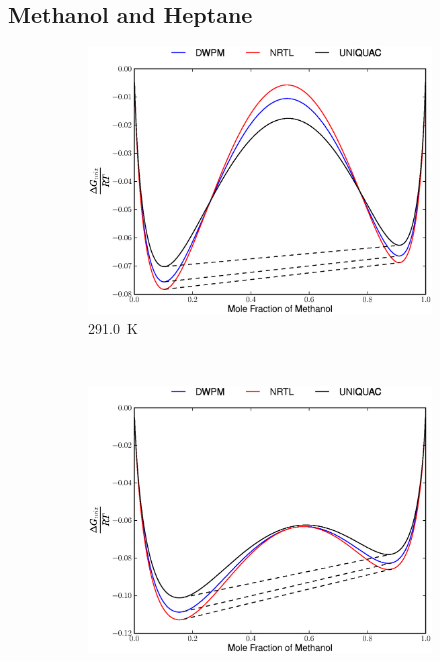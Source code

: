 \subsection{Methanol and Heptane}
\vspace*{\fill}
\begin{figure}[hp]
\begin{subfigure}[h]{0.5\textwidth}
\centering
\includegraphics[width = \textwidth]{Results_Parts/BinaryParams/methanol-heptane/AllModelsGibbsPlots/T_291.eps}
\caption{291.0~$\mathrm{K}$} \label{methanol-heptane291}
\end{subfigure}%
~%
\begin{subfigure}[h]{0.5\textwidth}
\centering
\includegraphics[width = \textwidth]{Results_Parts/BinaryParams/methanol-heptane/AllModelsGibbsPlots/T_303.eps}

\end{subfigure}
\end{figure}
